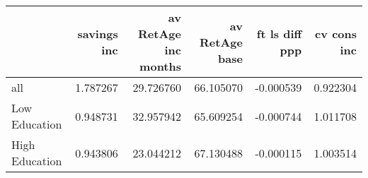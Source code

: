 \begin{tabular}{lrrrrr}
\toprule
 & savings inc & av RetAge inc months & av RetAge base & ft ls diff ppp & cv cons inc \\
\midrule
all & 1.787267 & 29.726760 & 66.105070 & -0.000539 & 0.922304 \\
Low Education & 0.948731 & 32.957942 & 65.609254 & -0.000744 & 1.011708 \\
High Education & 0.943806 & 23.044212 & 67.130488 & -0.000115 & 1.003514 \\
\bottomrule
\end{tabular}
